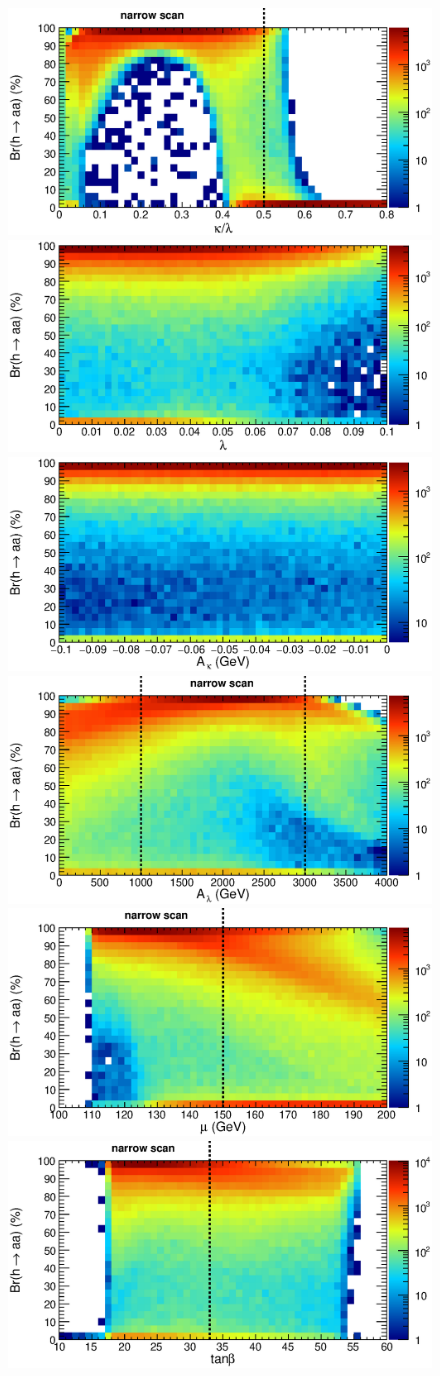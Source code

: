\documentclass[aps,12pt,superscriptaddress,nofootinbib,floatfix,showpacs]{revtex4}
\begin{document}
\begin{figure}[htb]
\begin{center}
\includegraphics[width=0.5\linewidth]{plots/brhaa_koverl.eps}%
\includegraphics[width=0.5\linewidth]{plots/brhaa_lambda.eps}
\\
\includegraphics[width=0.5\linewidth]{plots/brhaa_Akappa.eps}%
\includegraphics[width=0.5\linewidth]{plots/brhaa_Alambda.eps}
\\
\includegraphics[width=0.5\linewidth]{plots/brhaa_mu.eps}%
\includegraphics[width=0.5\linewidth]{plots/brhaa_tanbeta.eps}


\end{center}
\end{figure}
\end{document}
